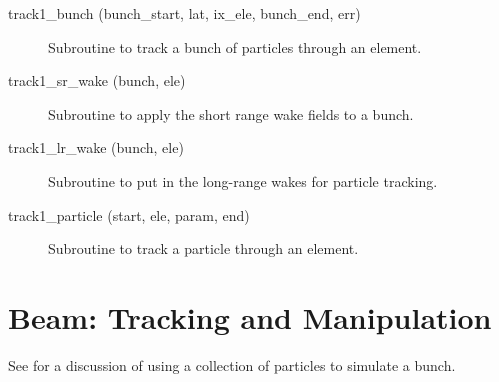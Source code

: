 \begin{description}
\label{r:track1.bunch}
\item[track1_bunch (bunch_start, lat, ix_ele, bunch_end, err)] \Newline 
Subroutine to track a bunch of particles through an element.

\label{r:track1.sr.wake}
\item[track1_sr_wake (bunch, ele)] \Newline 
Subroutine to apply the short range wake fields to a bunch. 

\label{r:track1.lr.wake}
\item[track1_lr_wake (bunch, ele)] \Newline 
Subroutine to put in the long-range wakes for particle tracking.

\label{r:track1.particle}
\item[track1_particle (start, ele, param, end)] \Newline 
Subroutine to track a particle through an element.

\end{description}

\section{Beam: Tracking and Manipulation}
\label{r:beam}    

See  for a discussion of using a collection of particles to simulate
a bunch.

